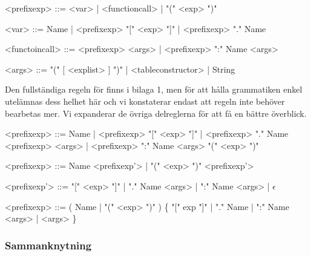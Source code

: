 \begin{description}
  \setlength{\grammarindent}{8em}
  \item[Ursprungsregel] \hfill
    \begin{grammar}
      \singlespace\small%
      \selectfont
      <prefixexp> ::= <var> | <functioncall> | "(" <exp> ")"

      <var> ::= Name | <prefixexp> "[" <exp> "]" | <prefixexp> "." Name

      <functoincall> ::= <prefixexp> <args> | <prefixexp> ":" Name <args>

      <args> ::= "(" [ <explist> ] ")" | <tableconstructor> | String
    \end{grammar}

    Den fullständiga regeln för  finns i bilaga 1, men för
    att hålla grammatiken enkel utelämnas dess helhet här och vi konstaterar
    endast att regeln inte behöver bearbetas mer. Vi expanderar de övriga
    delreglerna för att få en bättre överblick.

    \begin{grammar}
      \singlespace\small%
      \selectfont
      <prefixexp> ::= Name | <prefixexp> "[" <exp> "]" | <prefixexp> "." Name
        \alt <prefixexp> <args> | <prefixexp> ":" Name <args>
        \alt "(" <exp> ")"
    \end{grammar}

  \item[Eliminering av vänsterrekursion] \hfill
    \begin{grammar}
      \singlespace\small%
      \selectfont
      <prefixexp> ::= Name <prefixexp'> | "(" <exp> ")" <prefixexp'>

      <prefixexp'> ::= "[" <exp> "]" | "." Name <args> | ":" Name <args> |
      $\epsilon$
    \end{grammar}

  \item[Resultat] \hfill
    \begin{grammar}
      \singlespace\small%
      \selectfont
      <prefixexp> ::= ( Name | "(" <exp> ")" ) \{ "[" exp "]" | "." Name |
          ":" Name <args> | <args> \}
    \end{grammar}
\end{description}

\subsubsection{Sammanknytning}

